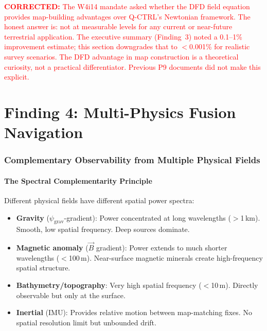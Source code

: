 \documentclass[11pt]{article}
\theoremstyle{definition}
\theoremstyle{remark}
\newcommand{\psigrav}{\psi_{\mathrm{grav}}}
\newcommand{\corrected}[1]{\textcolor{red}{\textbf{CORRECTED:} #1}}
\begin{document}
\corrected{The W4i14 mandate asked whether the DFD field equation
provides map-building advantages over Q-CTRL's Newtonian framework.
The honest answer is: not at measurable levels for any current or
near-future terrestrial application. The executive summary (Finding~3)
noted a 0.1--1\% improvement estimate; this section downgrades that
to $<$0.001\% for realistic survey scenarios. The DFD advantage in
map construction is a theoretical curiosity, not a practical
differentiator. Previous P9 documents did not make this explicit.}

\part{Finding 4: Multi-Physics Fusion Navigation}
\label{part:multi-physics}

\section{Complementary Observability from Multiple Physical Fields}
\label{sec:multi-physics-theory}

\subsection{The Spectral Complementarity Principle}

Different physical fields have different spatial power spectra:
\begin{itemize}[nosep]
\item \textbf{Gravity} ($\psigrav$-gradient): Power concentrated at
  long wavelengths ($>$1\,km). Smooth, low spatial frequency. Deep
  sources dominate.
\item \textbf{Magnetic anomaly} ($\vec{B}$ gradient): Power extends to
  much shorter wavelengths ($<$100\,m). Near-surface magnetic minerals
  create high-frequency spatial structure.
\item \textbf{Bathymetry/topography}: Very high spatial frequency
  ($<$10\,m). Directly observable but only at the surface.
\item \textbf{Inertial} (IMU): Provides relative motion between
  map-matching fixes. No spatial resolution limit but unbounded drift.
\end{itemize}
\end{document}
